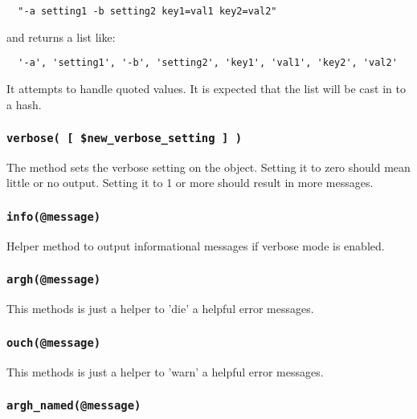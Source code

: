 \documentclass[12pt,a4paper]{article}
\begin{document}
\begin{verbatim}
  "-a setting1 -b setting2 key1=val1 key2=val2"
\end{verbatim}


and returns a list like:

\begin{verbatim}
  '-a', 'setting1', '-b', 'setting2', 'key1', 'val1', 'key2', 'val2'
\end{verbatim}


It attempts to handle quoted values.  It is expected that the list
will be cast in to a hash.

\subsubsection*{\texttt{verbose( [ \$new\_verbose\_setting ] )}\label{xPL::Base_verbose_new_verbose_setting_}}


The method sets the verbose setting on the object.  Setting it to zero
should mean little or no output.  Setting it to 1 or more should
result in more messages.

\subsubsection*{\texttt{info(@message)}\label{xPL::Base_info_message_}}


Helper method to output informational messages if verbose mode is enabled.

\subsubsection*{\texttt{argh(@message)}\label{xPL::Base_argh_message_}}


This methods is just a helper to 'die' a helpful error messages.

\subsubsection*{\texttt{ouch(@message)}\label{xPL::Base_ouch_message_}}


This methods is just a helper to 'warn' a helpful error messages.

\subsubsection*{\texttt{argh\_named(@message)}\label{xPL::Base_argh_named_message_}}
\end{document}

